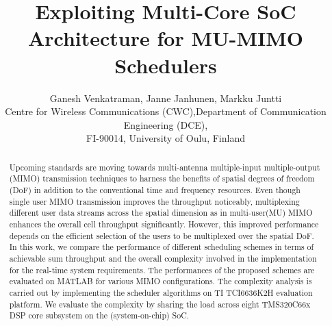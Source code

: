 \documentclass[conference,letterpaper]{./../../IEEE/IEEEtran}
\begin{document}
\title{Exploiting Multi-Core SoC Architecture for MU-MIMO Schedulers}

\author{\begin{tabular}{cc}
\multicolumn{2}{c}{Ganesh Venkatraman, Janne Janhunen, Markku Juntti}\\
Centre for Wireless Communications (CWC), & Department of Communication Engineering (DCE), \\
\multicolumn{2}{c}{FI-90014, University of Oulu, Finland}\\
\end{tabular}}

\maketitle

\begin{abstract}
Upcoming standards are moving towards multi-antenna multiple-input multiple-output (MIMO) transmission techniques to harness the benefits of spatial degrees of freedom (DoF) in addition to the conventional time and frequency resources. Even though single user MIMO transmission improves the throughput noticeably, multiplexing different user data streams across the spatial dimension as in multi-user(MU) MIMO enhances the overall cell throughput significantly. However, this improved performance depends on the efficient selection of the users to be multiplexed over the spatial DoF. In this work, we compare the performance of different scheduling schemes in terms of achievable sum throughput and the overall complexity involved in the implementation for the real-time system requirements. The performances of the proposed schemes are evaluated on MATLAB for various MIMO configurations. The complexity analysis is carried out by implementing the scheduler algorithms on TI TCI6636K2H evaluation platform. We evaluate the complexity by sharing the load across eight TMS320C66x DSP core subsystem on the (system-on-chip) SoC.
\end{abstract}

\acresetall
\end{document}
